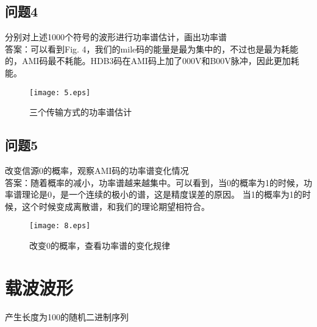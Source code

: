 \documentclass{article}
\begin{document}
\subsection{问题4}分别对上述1000个符号的波形进行功率谱估计，画出功率谱\\
答案：可以看到Fig. 4，我们的mile码的能量是最为集中的，不过也是最为耗能的，AMI码最不耗能。HDB3码在AMI码上加了000V和B00V脉冲，因此更加耗能。
\begin{figure}[!htb]
\begin{center}
		\texttt{[image: 5.eps]}
		\caption{三个传输方式的功率谱估计}
\end{center}
\end{figure}
\subsection{问题5}改变信源0的概率，观察AMI码的功率谱变化情况\\
答案：随着概率的减小，功率谱越来越集中。可以看到，当0的概率为1的时候，功率谱理论是0，是一个连续的极小的谱，这是精度误差的原因。
当1的概率为1的时候，这个时候变成离散谱，和我们的理论期望相符合。
\begin{figure}[!htb]
\begin{center}
		\texttt{[image: 8.eps]}
		\caption{改变0的概率，查看功率谱的变化规律}
\end{center}
\end{figure}
\section{载波波形}
产生长度为100的随机二进制序列
\end{document}
